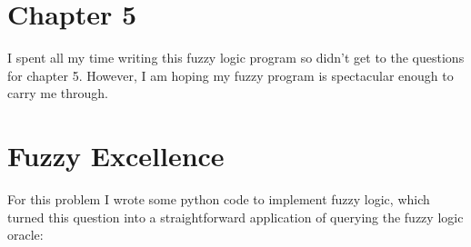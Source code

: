 \documentclass[12pt]{article}
\begin{document}
\maketitle

\section{Chapter 5}

I spent all my time writing this fuzzy logic program so didn't get to the questions for chapter 5.  However, I am hoping my fuzzy program is spectacular enough to carry me through.  

\section{Fuzzy Excellence}

For this problem I wrote some python code to implement fuzzy logic, which turned this question into a straightforward application of querying the fuzzy logic oracle:
\end{document}

